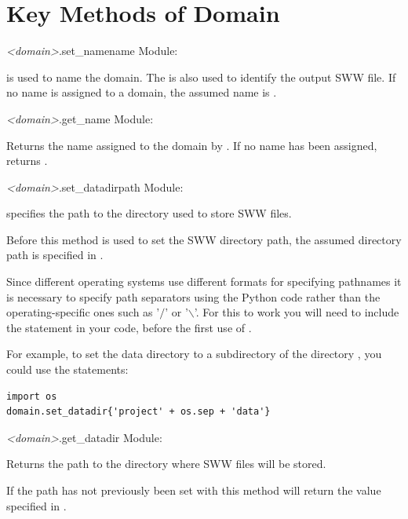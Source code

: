 \documentclass{manual}
\begin{document}
\section{Key Methods of Domain}

\begin{methoddesc}{\emph{<domain>}.set_name}{name}
Module: 

 is used to name the domain.  The  is also used to identify the output SWW file.
If no name is assigned to a domain, the assumed name is .
\end{methoddesc}

\begin{methoddesc}{\emph{<domain>}.get_name}{}
Module: 

Returns the name assigned to the domain by . If no name has been
assigned, returns .
\end{methoddesc}

\begin{methoddesc}{\emph{<domain>}.set_datadir}{path}
Module: 

 specifies the path to the directory used to store SWW files.

Before this method is used to set the SWW directory path, the assumed directory
path is  specified in .

Since different operating systems use different formats for specifying pathnames
it is necessary to specify path separators using the Python code  rather than
the operating-specific ones such as '$\slash$' or '$\backslash$'.
For this to work you will need to include the statement 
in your code, before the first use of .

For example, to set the data directory to a subdirectory
 of the directory , you could use
the statements:

\begin{verbatim}
import os
domain.set_datadir{'project' + os.sep + 'data'}
\end{verbatim}
\end{methoddesc}

\begin{methoddesc}{\emph{<domain>}.get_datadir}{}
Module: 

Returns the path to the directory where SWW files will be stored.

If the path has not previously been set with  this method
will return the value  specified in .
\end{methoddesc}
\end{document}
